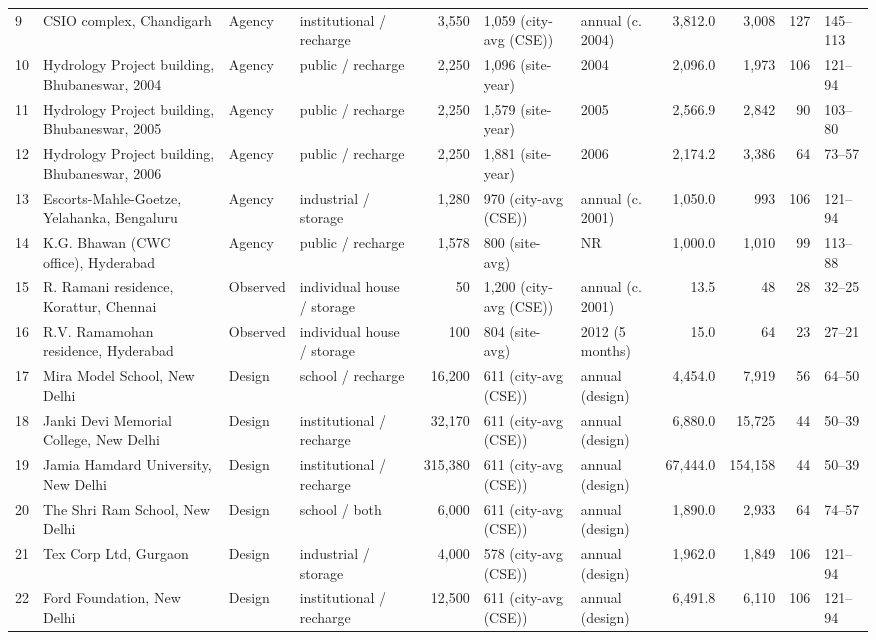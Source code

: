 {\begin{longtable}{l p{2.7cm} l >{\raggedright\arraybackslash}p{1.6cm} r p{1.6cm} p{1.1cm} r r r l}
9 & CSIO complex, Chandigarh & Agency & institutional / recharge & 3,550 & 1,059 (city-avg (CSE)) & annual (c. 2004) & 3,812.0 & 3,008 & 127 & 145--113\\
10 & Hydrology Project building, Bhubaneswar, 2004 & Agency & public / recharge & 2,250 & 1,096 (site-year) & 2004 & 2,096.0 & 1,973 & 106 & 121--94\\
11 & Hydrology Project building, Bhubaneswar, 2005 & Agency & public / recharge & 2,250 & 1,579 (site-year) & 2005 & 2,566.9 & 2,842 & 90 & 103--80\\
12 & Hydrology Project building, Bhubaneswar, 2006 & Agency & public / recharge & 2,250 & 1,881 (site-year) & 2006 & 2,174.2 & 3,386 & 64 & 73--57\\
13 & Escorts-Mahle-Goetze, Yelahanka, Bengaluru & Agency & industrial / storage & 1,280 & 970 (city-avg (CSE)) & annual (c. 2001) & 1,050.0 & 993 & 106 & 121--94\\
14 & K.G. Bhawan (CWC office), Hyderabad & Agency & public / recharge & 1,578 & 800 (site-avg) & NR & 1,000.0 & 1,010 & 99 & 113--88\\
15 & R. Ramani residence, Korattur, Chennai & Observed & individual house / storage & 50 & 1,200 (city-avg (CSE)) & annual (c. 2001) & 13.5 & 48 & 28 & 32--25\\
16 & R.V. Ramamohan residence, Hyderabad & Observed & individual house / storage & 100 & 804 (site-avg) & 2012 (5 months) & 15.0 & 64 & 23 & 27--21\\
17 & Mira Model School, New Delhi & Design & school / recharge & 16,200 & 611 (city-avg (CSE)) & annual (design) & 4,454.0 & 7,919 & 56 & 64--50\\
18 & Janki Devi Memorial College, New Delhi & Design & institutional / recharge & 32,170 & 611 (city-avg (CSE)) & annual (design) & 6,880.0 & 15,725 & 44 & 50--39\\
19 & Jamia Hamdard University, New Delhi & Design & institutional / recharge & 315,380 & 611 (city-avg (CSE)) & annual (design) & 67,444.0 & 154,158 & 44 & 50--39\\
20 & The Shri Ram School, New Delhi & Design & school / both & 6,000 & 611 (city-avg (CSE)) & annual (design) & 1,890.0 & 2,933 & 64 & 74--57\\
21 & Tex Corp Ltd, Gurgaon & Design & industrial / storage & 4,000 & 578 (city-avg (CSE)) & annual (design) & 1,962.0 & 1,849 & 106 & 121--94\\
22 & Ford Foundation, New Delhi & Design & institutional / recharge & 12,500 & 611 (city-avg (CSE)) & annual (design) & 6,491.8 & 6,110 & 106 & 121--94\\

\end{longtable}}
